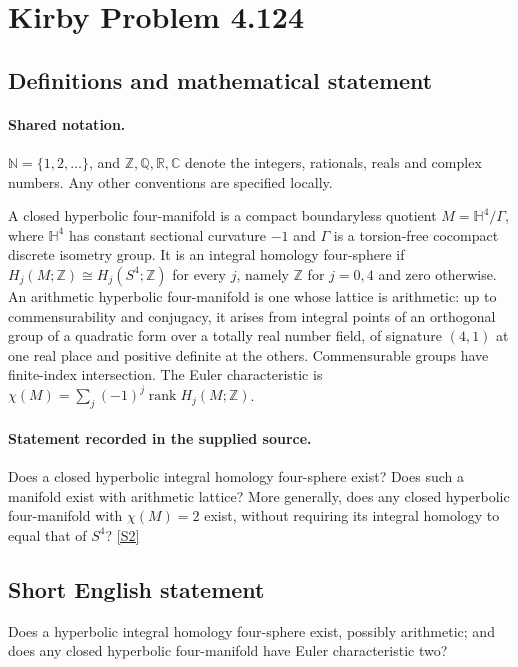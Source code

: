 \documentclass[11pt]{article}
\newcommand{\sref}[2]{\hyperlink{source:#1:#2}{[S#2]}}
\begin{document}
\section{Kirby Problem 4.124}\label{statement}

\subsection{Definitions and mathematical statement}

\paragraph{Shared notation.}$\mathbb N=\{1,2,\ldots\}$, and $\mathbb Z,\mathbb Q,\mathbb R,\mathbb C$ denote the integers, rationals, reals and complex numbers. Any other conventions are specified locally.


A closed hyperbolic four-manifold is a compact boundaryless quotient $M=\mathbb H^4/\Gamma$, where $\mathbb H^4$ has constant sectional curvature $-1$ and $\Gamma$ is a torsion-free cocompact discrete isometry group. It is an integral homology four-sphere if $H_j(M;\mathbb Z)\cong H_j(S^4;\mathbb Z)$ for every $j$, namely $\mathbb Z$ for $j=0,4$ and zero otherwise. An arithmetic hyperbolic four-manifold is one whose lattice is arithmetic: up to commensurability and conjugacy, it arises from integral points of an orthogonal group of a quadratic form over a totally real number field, of signature $(4,1)$ at one real place and positive definite at the others. Commensurable groups have finite-index intersection. The Euler characteristic is $\chi(M)=\sum_j(-1)^j\operatorname{rank}H_j(M;\mathbb Z)$.
\paragraph{Statement recorded in the supplied source.}
Does a closed hyperbolic integral homology four-sphere exist? Does such a manifold exist with arithmetic lattice? More generally, does any closed hyperbolic four-manifold with $\chi(M)=2$ exist, without requiring its integral homology to equal that of $S^4$? \sref{statement}{2}
\subsection{Short English statement}
Does a hyperbolic integral homology four-sphere exist, possibly arithmetic; and does any closed hyperbolic four-manifold have Euler characteristic two?
\end{document}
